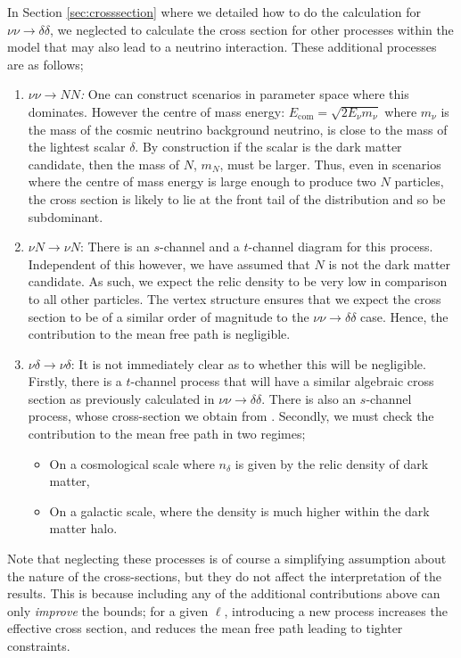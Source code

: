 \documentclass[11pt]{article}
\numberwithin{equation}{section}
\numberwithin{figure}{section}
\numberwithin{table}{section}
\begin{document}
In Section \ref{sec:crosssection} where we detailed how to do the calculation for $\nu\nu \rightarrow \delta\delta$, we neglected to calculate the cross section for other processes within the model that may also lead to a neutrino interaction. These additional processes are as follows;
\begin{enumerate}
  \item \textit{$\nu\nu \rightarrow NN$:} One can construct scenarios in parameter space where this dominates. However the centre of mass energy: $E_{\mathrm{com}} = \sqrt{2 E_\nu m_\nu}$ where $m_\nu$ is the mass of the cosmic neutrino background neutrino, is close to the mass of the lightest scalar $\delta$. By construction if the scalar is the dark matter candidate, then the mass of $N$, $m_N$, must be larger. Thus, even in scenarios where the centre of mass energy is large enough to produce two $N$ particles, the cross section is likely to lie at the front tail of the distribution and so be subdominant.
  \item $\nu N \rightarrow \nu N$: There is an $s$-channel and a $t$-channel diagram for this process. Independent of this however, we have assumed that $N$ is not the dark matter candidate. As such, we expect the relic density to be very low in comparison to all other particles. The vertex structure ensures that we expect the cross section to be of a similar order of magnitude to the $\nu\nu \rightarrow \delta\delta$ case. Hence, the contribution to the mean free path is negligible.
  \item $\nu\delta \rightarrow \nu\delta$: It is not immediately clear as to whether this will be negligible. Firstly, there is a $t$-channel process that will have a similar algebraic cross section as previously calculated in $\nu\nu \rightarrow \delta\delta$. There is also an $s$-channel process, whose cross-section we obtain from \cite{Franarin2018}. Secondly, we must check the contribution to the mean free path in two regimes;
  \begin{itemize}
    \item On a cosmological scale where $n_\delta$ is given by the relic density of dark matter,
    \item On a galactic scale, where the density is much higher within the dark matter halo.
  \end{itemize}
\end{enumerate}
Note that neglecting these processes is of course a simplifying assumption about the nature of the cross-sections, but they do not affect the interpretation of the results. This is because including any of the additional contributions above can only \textit{improve} the bounds; for a given $\ell$, introducing a new process increases the effective cross section, and reduces the mean free path leading to tighter constraints.
\end{document}
